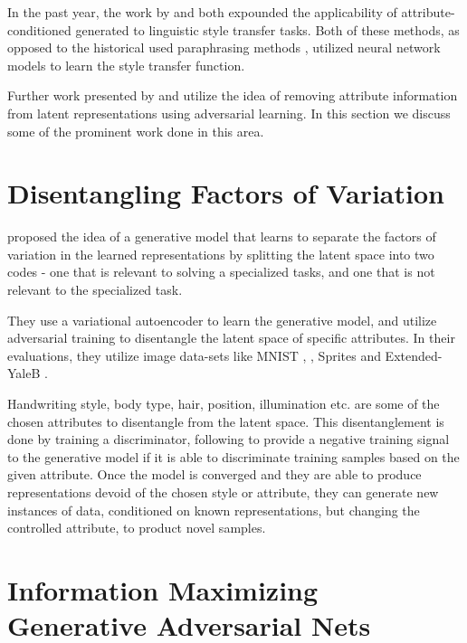 In the past year, the work by \cite{hu2017toward} and \cite{ficler2017controlling} both expounded the applicability of attribute-conditioned generated to linguistic style transfer tasks. Both of these methods, as opposed to the historical used paraphrasing methods \citep{xu2012paraphrasing}, utilized neural network models \citep{lecun2015deep} to learn the style transfer function.

Further work presented by \cite{shen2017style} and \cite{fu2017style} utilize the idea of removing attribute information from latent representations using adversarial learning. In this section we discuss some of the prominent work done in this area.

\section{Disentangling Factors of Variation}

\cite{mathieu2016disentangling} proposed the idea of a generative model that learns to separate the factors of variation in the learned representations by splitting the latent space into two codes - one that is relevant to solving a specialized tasks, and one that is not relevant to the specialized task.

They use a variational autoencoder to learn the generative model, and utilize adversarial training to disentangle the latent space of specific attributes. In their evaluations, they utilize image data-sets like MNIST \citep{lecun2010mnist},
\citep{lecun2004learning}, Sprites \citep{reed2015deep} and Extended-YaleB \citep{georghiades2001few}.

Handwriting style, body type, hair, position, illumination etc. are some of the chosen attributes to disentangle from the latent space. This disentanglement is done by training a discriminator, following \cite{goodfellow2014generative} to provide a negative training signal to the generative model if it is able to discriminate training samples based on the given attribute. Once the model is converged and they are able to produce representations devoid of the chosen style or attribute, they can generate new instances of data, conditioned on known representations, but changing the controlled attribute, to product novel samples.


\section{Information Maximizing Generative Adversarial Nets}


